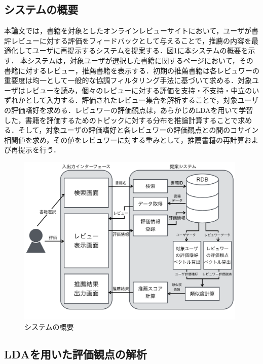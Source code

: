 \documentclass[a4paper,11pt,oneside,openany]{jsbook}
\begin{document}
\subsection{システムの概要}
本論文では，書籍を対象としたオンラインレビューサイトにおいて，ユーザが書評レビューに対する評価をフィードバックとして与えることで，推薦の内容を最適化してユーザに再提示するシステムを提案する．図\ref{fig:sys}に本システムの概要を示す．
本システムは，対象ユーザが選択した書籍に関するページにおいて，その書籍に対するレビュー，推薦書籍を表示する．初期の推薦書籍は各レビュワーの重要度は均一として一般的な協調フィルタリング手法に基づいて求める．対象ユーザはレビューを読み，個々のレビューに対する評価を支持・不支持・中立のいずれかとして入力する．評価されたレビュー集合を解析することで，対象ユーザの評価嗜好を求める．レビュワーの評価観点は，あらかじめLDAを用いて学習した，書籍を評価するためのトピックに対する分布を推論計算することで求める．そして，対象ユーザの評価嗜好と各レビュワーの評価観点との間のコサイン相関値を求め，その値をレビュワーに対する重みとして，推薦書籍の再計算および再提示を行う．
\begin{figure}[htb]
\begin{center}
\includegraphics[width = 110mm]{figures/sys_image.pdf}
\end{center}
\caption{システムの概要}
\label{fig:sys}
\end{figure}


\subsection{LDAを用いた評価観点の解析}
\end{document}
